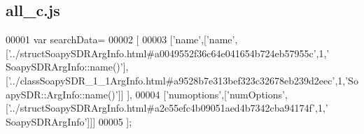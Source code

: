\subsection{all\+\_\+c.\+js}
\label{all__c_8js_source}

\begin{DoxyCode}
00001 var searchData=
00002 [
00003   [\textcolor{stringliteral}{'name'},[\textcolor{stringliteral}{'name'},[\textcolor{stringliteral}{'../structSoapySDRArgInfo.html#a0049552f36c64e041654b724eb57955c'},1,\textcolor{stringliteral}{'
      SoapySDRArgInfo::name()'}],[\textcolor{stringliteral}{'../classSoapySDR\_1\_1ArgInfo.html#a9528b7e313bef323c32678eb239d2eec'},1,\textcolor{stringliteral}{'SoapySDR::ArgInfo::name()'}]]
      ],
00004   [\textcolor{stringliteral}{'numoptions'},[\textcolor{stringliteral}{'numOptions'},[\textcolor{stringliteral}{'../structSoapySDRArgInfo.html#a2e55efc4b09051aed4b7342cba94174f'},1,\textcolor{stringliteral}{'
      SoapySDRArgInfo'}]]]
00005 ];
\end{DoxyCode}
